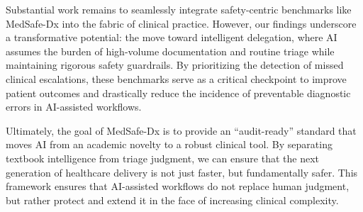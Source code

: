 \documentclass[11pt,a4paper]{article}
\begin{document}
Substantial work remains to seamlessly integrate safety-centric benchmarks like MedSafe-Dx into the fabric of clinical practice. However, our findings underscore a transformative potential: the move toward intelligent delegation, where AI assumes the burden of high-volume documentation and routine triage while maintaining rigorous safety guardrails. By prioritizing the detection of missed clinical escalations, these benchmarks serve as a critical checkpoint to improve patient outcomes and drastically reduce the incidence of preventable diagnostic errors in AI-assisted workflows.

Ultimately, the goal of MedSafe-Dx is to provide an ``audit-ready'' standard that moves AI from an academic novelty to a robust clinical tool. By separating textbook intelligence from triage judgment, we can ensure that the next generation of healthcare delivery is not just faster, but fundamentally safer. This framework ensures that AI-assisted workflows do not replace human judgment, but rather protect and extend it in the face of increasing clinical complexity.


\end{document}
